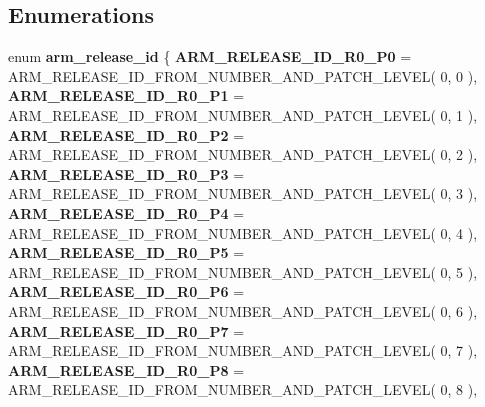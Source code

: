 \subsection*{Enumerations}
\begin{DoxyCompactItemize}
\item 
\mbox{\label{arm-release-id_8h_afa9eacb4490ab2a1fb4643ad1cac3936}} 
enum {\bfseries arm\+\_\+release\+\_\+id} \{ \newline
{\bfseries A\+R\+M\+\_\+\+R\+E\+L\+E\+A\+S\+E\+\_\+\+I\+D\+\_\+\+R0\+\_\+\+P0} = A\+R\+M\+\_\+\+R\+E\+L\+E\+A\+S\+E\+\_\+\+I\+D\+\_\+\+F\+R\+O\+M\+\_\+\+N\+U\+M\+B\+E\+R\+\_\+\+A\+N\+D\+\_\+\+P\+A\+T\+C\+H\+\_\+\+L\+E\+V\+EL( 0, 0 ), 
{\bfseries A\+R\+M\+\_\+\+R\+E\+L\+E\+A\+S\+E\+\_\+\+I\+D\+\_\+\+R0\+\_\+\+P1} = A\+R\+M\+\_\+\+R\+E\+L\+E\+A\+S\+E\+\_\+\+I\+D\+\_\+\+F\+R\+O\+M\+\_\+\+N\+U\+M\+B\+E\+R\+\_\+\+A\+N\+D\+\_\+\+P\+A\+T\+C\+H\+\_\+\+L\+E\+V\+EL( 0, 1 ), 
{\bfseries A\+R\+M\+\_\+\+R\+E\+L\+E\+A\+S\+E\+\_\+\+I\+D\+\_\+\+R0\+\_\+\+P2} = A\+R\+M\+\_\+\+R\+E\+L\+E\+A\+S\+E\+\_\+\+I\+D\+\_\+\+F\+R\+O\+M\+\_\+\+N\+U\+M\+B\+E\+R\+\_\+\+A\+N\+D\+\_\+\+P\+A\+T\+C\+H\+\_\+\+L\+E\+V\+EL( 0, 2 ), 
{\bfseries A\+R\+M\+\_\+\+R\+E\+L\+E\+A\+S\+E\+\_\+\+I\+D\+\_\+\+R0\+\_\+\+P3} = A\+R\+M\+\_\+\+R\+E\+L\+E\+A\+S\+E\+\_\+\+I\+D\+\_\+\+F\+R\+O\+M\+\_\+\+N\+U\+M\+B\+E\+R\+\_\+\+A\+N\+D\+\_\+\+P\+A\+T\+C\+H\+\_\+\+L\+E\+V\+EL( 0, 3 ), 
\newline
{\bfseries A\+R\+M\+\_\+\+R\+E\+L\+E\+A\+S\+E\+\_\+\+I\+D\+\_\+\+R0\+\_\+\+P4} = A\+R\+M\+\_\+\+R\+E\+L\+E\+A\+S\+E\+\_\+\+I\+D\+\_\+\+F\+R\+O\+M\+\_\+\+N\+U\+M\+B\+E\+R\+\_\+\+A\+N\+D\+\_\+\+P\+A\+T\+C\+H\+\_\+\+L\+E\+V\+EL( 0, 4 ), 
{\bfseries A\+R\+M\+\_\+\+R\+E\+L\+E\+A\+S\+E\+\_\+\+I\+D\+\_\+\+R0\+\_\+\+P5} = A\+R\+M\+\_\+\+R\+E\+L\+E\+A\+S\+E\+\_\+\+I\+D\+\_\+\+F\+R\+O\+M\+\_\+\+N\+U\+M\+B\+E\+R\+\_\+\+A\+N\+D\+\_\+\+P\+A\+T\+C\+H\+\_\+\+L\+E\+V\+EL( 0, 5 ), 
{\bfseries A\+R\+M\+\_\+\+R\+E\+L\+E\+A\+S\+E\+\_\+\+I\+D\+\_\+\+R0\+\_\+\+P6} = A\+R\+M\+\_\+\+R\+E\+L\+E\+A\+S\+E\+\_\+\+I\+D\+\_\+\+F\+R\+O\+M\+\_\+\+N\+U\+M\+B\+E\+R\+\_\+\+A\+N\+D\+\_\+\+P\+A\+T\+C\+H\+\_\+\+L\+E\+V\+EL( 0, 6 ), 
{\bfseries A\+R\+M\+\_\+\+R\+E\+L\+E\+A\+S\+E\+\_\+\+I\+D\+\_\+\+R0\+\_\+\+P7} = A\+R\+M\+\_\+\+R\+E\+L\+E\+A\+S\+E\+\_\+\+I\+D\+\_\+\+F\+R\+O\+M\+\_\+\+N\+U\+M\+B\+E\+R\+\_\+\+A\+N\+D\+\_\+\+P\+A\+T\+C\+H\+\_\+\+L\+E\+V\+EL( 0, 7 ), 
\newline
{\bfseries A\+R\+M\+\_\+\+R\+E\+L\+E\+A\+S\+E\+\_\+\+I\+D\+\_\+\+R0\+\_\+\+P8} = A\+R\+M\+\_\+\+R\+E\+L\+E\+A\+S\+E\+\_\+\+I\+D\+\_\+\+F\+R\+O\+M\+\_\+\+N\+U\+M\+B\+E\+R\+\_\+\+A\+N\+D\+\_\+\+P\+A\+T\+C\+H\+\_\+\+L\+E\+V\+EL( 0, 8 ), 

\end{DoxyCompactItemize}
